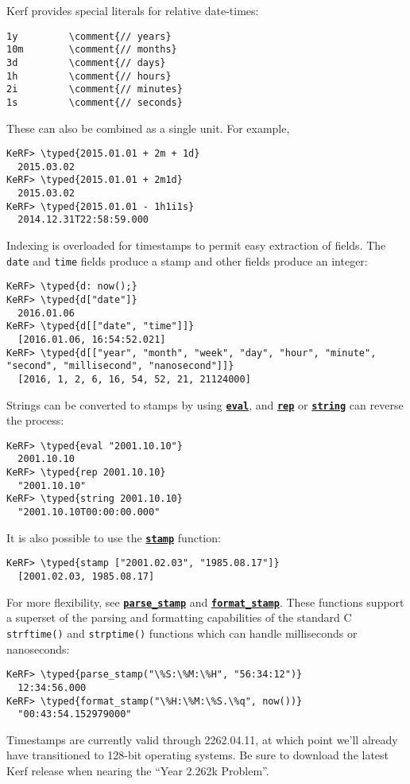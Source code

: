 \documentclass{article}
\newcommand{\typed}[1]{\textcolor{TealBlue}{#1}}
\newcommand{\comment}[1]{\textcolor{Orange}{#1}}
\newcommand{\primu}[2]{\hyperref[prim:#2]{\textbf{\texttt{#1}}}}
\newcommand{\prim}[1]{\primu{#1}{#1}}
\begin{document}
Kerf provides special literals for relative date-times:
\begin{Verbatim}
1y         \comment{// years}
10m        \comment{// months}
3d         \comment{// days}
1h         \comment{// hours}
2i         \comment{// minutes}
1s         \comment{// seconds}
\end{Verbatim}
These can also be combined as a single unit. For example,
\begin{Verbatim}
KeRF> \typed{2015.01.01 + 2m + 1d}
  2015.03.02
KeRF> \typed{2015.01.01 + 2m1d}
  2015.03.02
KeRF> \typed{2015.01.01 - 1h1i1s}
  2014.12.31T22:58:59.000
\end{Verbatim}
Indexing is overloaded for timestamps to permit easy extraction of fields. The \texttt{date} and \texttt{time} fields produce a stamp and other fields produce an integer:
\begin{Verbatim}
KeRF> \typed{d: now();}
KeRF> \typed{d["date"]}
  2016.01.06
KeRF> \typed{d[["date", "time"]]}
  [2016.01.06, 16:54:52.021]
KeRF> \typed{d[["year", "month", "week", "day", "hour", "minute", "second", "millisecond", "nanosecond"]]}
  [2016, 1, 2, 6, 16, 54, 52, 21, 21124000]
\end{Verbatim}

Strings can be converted to stamps by using \prim{eval}, and \prim{rep} or \prim{string} can reverse the process:
\begin{Verbatim}
KeRF> \typed{eval "2001.10.10"}
  2001.10.10
KeRF> \typed{rep 2001.10.10}
  "2001.10.10"
KeRF> \typed{string 2001.10.10}
  "2001.10.10T00:00:00.000"
\end{Verbatim}

It is also possible to use the \prim{stamp} function:
\begin{Verbatim}
KeRF> \typed{stamp ["2001.02.03", "1985.08.17"]}
  [2001.02.03, 1985.08.17]
\end{Verbatim}

For more flexibility, see \primu{parse\_stamp}{parseStamp} and \primu{format\_stamp}{formatStamp}. These functions support a superset of the parsing and formatting capabilities of the standard C \texttt{strftime()} and \texttt{strptime()} functions which can handle milliseconds or nanoseconds:
\begin{Verbatim}
KeRF> \typed{parse_stamp("\%S:\%M:\%H", "56:34:12")}
  12:34:56.000
KeRF> \typed{format_stamp("\%H:\%M:\%S.\%q", now())}
  "00:43:54.152979000"
\end{Verbatim}

Timestamps are currently valid through 2262.04.11, at which point we'll already have transitioned to 128-bit operating systems. Be sure to download the latest Kerf release when nearing the ``Year 2.262k Problem''.
\end{document}
